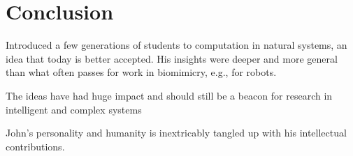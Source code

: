 \documentclass{sig-alternate}
\begin{document}
\section{Conclusion}

Introduced a few generations of students to computation in natural systems, an idea that today is better accepted.  His insights were deeper and more general than what often passes for work in biomimicry, e.g., for robots.

The ideas have had huge impact and should still be a beacon for research in intelligent and complex systems

John's personality and humanity is inextricably tangled up with his intellectual contributions.
\end{document}
